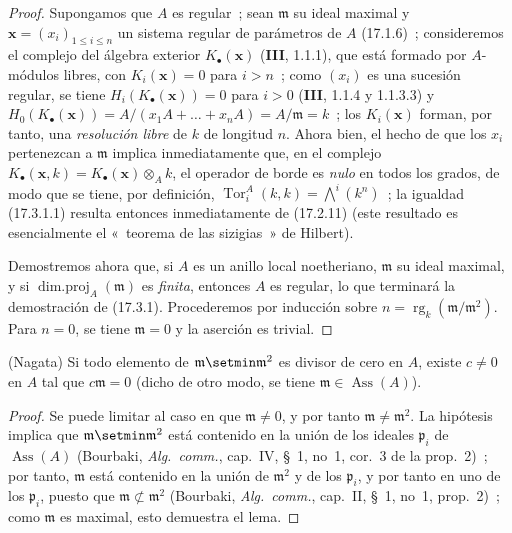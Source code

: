 \begin{proof}
Supongamos que $A$ es regular~; sean $\mathfrak{m}$ su ideal maximal y
$\mathbf{x}=(x_i)_{1\leq i\leq n}$ un sistema regular de parámetros de $A$
(17.1.6)~; consideremos el complejo del álgebra exterior
$K_\bullet(\mathbf{x})$ (\textbf{III}, 1.1.1), que está formado por $A$-módulos
libres, con $K_i(\mathbf{x})=0$ para $i>n$~; como $(x_i)$ es una sucesión
regular, se tiene $H_i(K_\bullet(\mathbf{x}))=0$ para $i>0$ (\textbf{III},
1.1.4 y 1.1.3.3) y
$H_0(K_\bullet(\mathbf{x}))=A/(x_1A+\ldots+x_nA)=A/\mathfrak{m}=k$~; los
$K_i(\mathbf{x})$ forman, por tanto, una \emph{resolución libre} de $k$ de
longitud $n$. Ahora bien, el hecho de que los $x_i$ pertenezcan a $\mathfrak{m}$
implica inmediatamente que, en el complejo
$K_\bullet(\mathbf{x},k)=K_\bullet(\mathbf{x})\otimes_A k$, el operador de borde
es \emph{nulo} en todos los grados, de modo que se tiene, por definición,
$\operatorname{Tor}^A_i(k,k)=\bigwedge^i(k^n)$~; la igualdad (17.3.1.1) resulta
entonces inmediatamente de (17.2.11) (este resultado es esencialmente el «~teorema de las
sizigias~» de Hilbert).

Demostremos ahora que, si $A$ es un anillo local noetheriano,
$\mathfrak{m}$ su ideal maximal, y si
$\operatorname{dim.proj}_A(\mathfrak{m})$ es \emph{finita}, entonces $A$ es
regular, lo que terminará la demostración de (17.3.1). Procederemos por
inducción sobre $n=\operatorname{rg}_k(\mathfrak{m}/\mathfrak{m}^2)$. Para
$n=0$, se tiene $\mathfrak{m}=0$ y la aserción es trivial.
\end{proof}

\begin{lemma}[17.3.1.2]
\label{0.17.3.1.2-fr}
\textnormal{(Nagata)} Si todo elemento de
$\mathfrak{m}\setmin\mathfrak{m}^2$ es divisor de cero en $A$, existe
$c\neq0$ en $A$ tal que $c\mathfrak{m}=0$ (dicho de otro modo, se tiene
$\mathfrak{m}\in\operatorname{Ass}(A)$).
\end{lemma}

\begin{proof}
Se puede limitar al caso en que $\mathfrak{m}\neq0$, y por tanto
$\mathfrak{m}\neq\mathfrak{m}^2$. La hipótesis implica que
$\mathfrak{m}\setmin\mathfrak{m}^2$ está contenido en la unión de los ideales
$\mathfrak{p}_i$ de $\operatorname{Ass}(A)$ (Bourbaki,
\emph{Alg.~comm.}, cap.~IV, \S~1, no~1, cor.~3 de la prop.~2)~; por tanto,
$\mathfrak{m}$ está contenido en la unión de $\mathfrak{m}^2$
y de los $\mathfrak{p}_i$, y por tanto en uno de los $\mathfrak{p}_i$, puesto que
$\mathfrak{m}\not\subset\mathfrak{m}^2$ (Bourbaki, \emph{Alg.~comm.},
cap.~II, \S~1, no~1, prop.~2)~; como $\mathfrak{m}$ es maximal, esto demuestra el
lema.
\end{proof}

